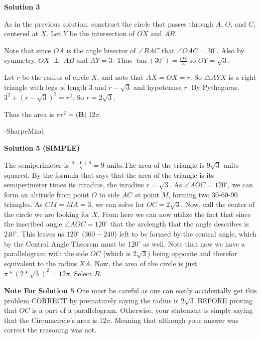 \begin{enumerate}
\textbf{Solution 3}

As in the previous solution, construct the circle that passes through $A$, $O$, and $C$, centered at $X$. Let $Y$ be the intersection of $\overline{OX}$ and $\overline{AB}$.

 Note that since $\overline{OA}$ is the angle bisector of $\angle BAC$ that $\angle OAC=30^\circ$. Also by symmetry, $\overline{OX}$ $\perp$ $\overline{AB}$ and $AY = 3$. Thus $\tan(30^\circ) = \frac{OY}{3}$ so $OY = \sqrt{3}$.

 Let $r$ be the radius of circle $X$, and note that $AX = OX = r$. So $\triangle AYX$ is a right triangle with legs of length $3$ and $r - \sqrt{3}$ and hypotenuse $r$. By Pythagoras, $3^2 + (r - \sqrt{3})^2 = r^2$. So $r = 2\sqrt{3}$.

 Thus the area is $\pi r^2 = \boxed{\textbf{(B)}\ 12\pi}$.

 -SharpeMind

 



\textbf{Solution 5 (SIMPLE)}

The semiperimeter is $\frac{6+6+6}{2}=9$ units.The area of the triangle is $9\sqrt{3}$ units squared.  By the formula that says that the area of the triangle is its semiperimeter times its inradius, the inradius $r=\sqrt{3}$. As $\angle{AOC}=120^\circ$, we can form an altitude from point $O$ to side $AC$ at point $M$, forming two 30-60-90 triangles. As $CM=MA=3$, we can solve for $OC=2\sqrt{3}$. Now, call the center of the circle we are looking for $X$. From here we can now utilize the fact that since the inscribed angle $\angle{AOC}=120^\circ$ that the arclength that the angle describes is $240^\circ$. This leaves us $120^\circ$ ($360-240$) left to be formed by the central angle, which by the Central Angle Theorem must be $120^\circ$ as well. Note that now we have a parallelogram with the side $OC$ (which is $2\sqrt{3}$) being opposite and therefor equivalent to the radius $XA$. Now, the area of the circle is just $\pi*(2*\sqrt{3})^2 = 12\pi$. Select $\boxed{B}$.

 \textbf{Note For Solution 5} One must be careful as one can easily accidentally get this problem CORRECT by prematurely saying the radius is $2\sqrt{3}$ BEFORE proving that $OC$ is a part of a parallelogram. Otherwise, your statement is simply saying that the Circumcircle's area is $12\pi$. Meaning that although your answer was correct the reasoning was not.

 




\end{enumerate}
